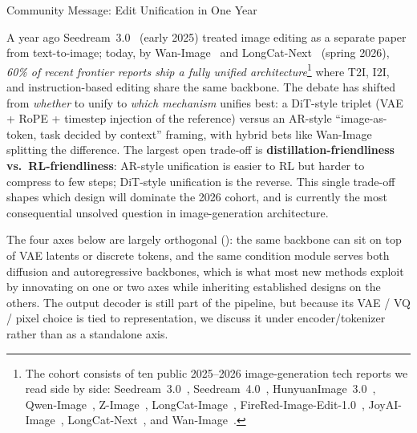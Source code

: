 \documentclass{llmxive}
\begin{document}
\begin{highlightbox}{Community Message: Edit Unification in One Year}

A year ago Seedream~3.0~\citep{gao2025seedream} (early 2025) treated image editing as a separate paper from text-to-image; today, by Wan-Image~\citep{mao2026wan} and LongCat-Next~\citep{team2026longcat} (spring 2026), \emph{60\% of recent frontier reports ship a fully unified architecture}\footnote{The cohort consists of ten public 2025--2026 image-generation tech reports we read side by side: Seedream~3.0~\citep{gao2025seedream}, Seedream~4.0~\citep{seedream2025seedream}, HunyuanImage~3.0~\citep{cao2025hunyuanimage}, Qwen-Image~\citep{wu2025qwen}, Z-Image~\citep{cai2025z}, LongCat-Image~\citep{team2025longcat}, FireRed-Image-Edit-1.0~\citep{team2026firered}, JoyAI-Image~\citep{jdjoyaiimage}, LongCat-Next~\citep{team2026longcat}, and Wan-Image~\citep{mao2026wan}.} where T2I, I2I, and instruction-based editing share the same backbone. The debate has shifted from \emph{whether} to unify to \emph{which mechanism} unifies best: a DiT-style triplet (VAE + RoPE + timestep injection of the reference) versus an AR-style ``image-as-token, task decided by context'' framing, with hybrid bets like Wan-Image splitting the difference. The largest open trade-off is \textbf{distillation-friendliness vs.\ RL-friendliness}: AR-style unification is easier to RL but harder to compress to few steps; DiT-style unification is the reverse. This single trade-off shapes which design will dominate the 2026 cohort, and is currently the most consequential unsolved question in image-generation architecture.
\end{highlightbox}


The four axes below are largely orthogonal (): the same backbone can sit on top of VAE latents or discrete tokens, and the same condition module serves both diffusion and autoregressive backbones, which is what most new methods exploit by innovating on one or two axes while inheriting established designs on the others. The output decoder is still part of the pipeline, but because its VAE / VQ / pixel choice is tied to representation, we discuss it under encoder/tokenizer rather than as a standalone axis.
\end{document}
